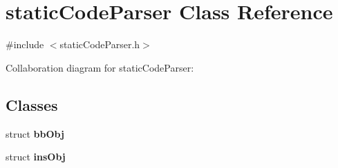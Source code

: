 \hypertarget{classstaticCodeParser}{
\section{staticCodeParser Class Reference}
\label{classstaticCodeParser}
}


{\ttfamily \#include $<$staticCodeParser.h$>$}



Collaboration diagram for staticCodeParser:
\subsection*{Classes}
\begin{DoxyCompactItemize}
\item 
struct {\bfseries bbObj}
\item 
struct {\bfseries insObj}
\end{DoxyCompactItemize}
